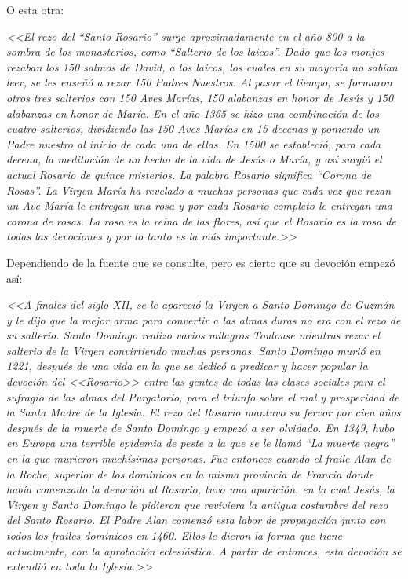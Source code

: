 \documentclass[12pt, letterpaper]{report}
\begin{document}
    \Large O esta otra:
    
    \Large \textit{<<El rezo del ``Santo Rosario'' surge aproximadamente en el año 800 a la sombra de los monasterios, como ``Salterio de los laicos''. Dado que los monjes rezaban los 150 salmos de David, a los laicos, los cuales en su mayoría no sabían leer, se les enseñó a rezar 150 Padres Nuestros. Al pasar el tiempo, se formaron otros tres salterios con 150 Aves Marías, 150 alabanzas en honor de Jesús y 150 alabanzas en honor de María. En el año 1365 se hizo una combinación de los cuatro salterios, dividiendo las 150 Aves Marías en 15 decenas y poniendo un Padre nuestro al inicio de cada una de ellas. En 1500 se estableció, para cada decena, la meditación de un hecho de la vida de Jesús o María, y así surgió el actual Rosario de quince misterios. La palabra Rosario significa ``Corona de Rosas''. La Virgen María ha revelado a muchas personas que cada vez que rezan un Ave María le entregan una rosa y por cada Rosario completo le entregan una corona de rosas. La rosa es la reina de las flores, así que el Rosario es la rosa de todas las devociones y por lo tanto es la más importante.>>}\cite{AciPrensaRosario}
    
    \Large Dependiendo de la fuente que se consulte, pero es cierto que su devoción empezó así:
    
    \Large \textit{<<A finales del siglo XII, se le apareció la Virgen a Santo Domingo de Guzmán y le dijo que la mejor arma para convertir a las almas duras no era con el rezo de su salterio. Santo Domingo realizo varios milagros Toulouse mientras rezar el salterio de la Virgen convirtiendo muchas personas. Santo Domingo murió en 1221, después de una vida en la que se dedicó a predicar y hacer popular la devoción del <<Rosario>> entre las gentes de todas las clases sociales para el sufragio de las almas del Purgatorio, para el triunfo sobre el mal y prosperidad de la Santa Madre de la Iglesia. El rezo del Rosario mantuvo su fervor por cien años después de la muerte de Santo Domingo y empezó a ser olvidado. En 1349, hubo en Europa una terrible epidemia de peste a la que se le llamó ``La muerte negra'' en la que murieron muchísimas personas. Fue entonces cuando el fraile Alan de la Roche, superior de los dominicos en la misma provincia de Francia donde había comenzado la devoción al Rosario, tuvo una aparición, en la cual Jesús, la Virgen y Santo Domingo le pidieron que reviviera la antigua costumbre del rezo del Santo Rosario. El Padre Alan comenzó esta labor de propagación junto con todos los frailes dominicos en 1460. Ellos le dieron la forma que tiene actualmente, con la aprobación eclesiástica. A partir de entonces, esta devoción se extendió en toda la Iglesia.>>}\cite{RorasioCatholicNet}
    
\end{document}
